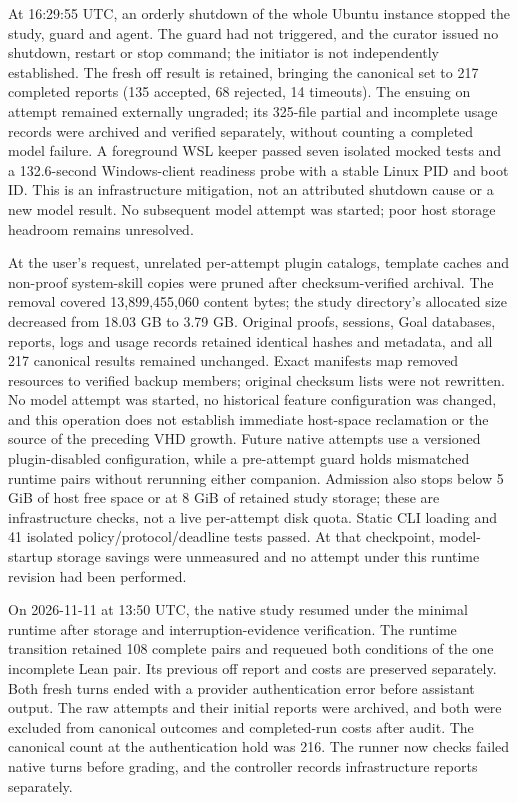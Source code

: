 \documentclass{article}
\begin{document}
At 16:29:55 UTC, an orderly shutdown of the whole Ubuntu instance stopped the study, guard and agent. The guard had not triggered, and the curator issued no shutdown, restart or stop command; the initiator is not independently established. The fresh off result is retained, bringing the canonical set to 217 completed reports (135 accepted, 68 rejected, 14 timeouts). The ensuing on attempt remained externally ungraded; its 325-file partial and incomplete usage records were archived and verified separately, without counting a completed model failure. A foreground WSL keeper passed seven isolated mocked tests and a 132.6-second Windows-client readiness probe with a stable Linux PID and boot ID. This is an infrastructure mitigation, not an attributed shutdown cause or a new model result. No subsequent model attempt was started; poor host storage headroom remains unresolved.

At the user's request, unrelated per-attempt plugin catalogs, template caches and non-proof system-skill copies were pruned after checksum-verified archival. The removal covered 13,899,455,060 content bytes; the study directory's allocated size decreased from 18.03 GB to 3.79 GB. Original proofs, sessions, Goal databases, reports, logs and usage records retained identical hashes and metadata, and all 217 canonical results remained unchanged. Exact manifests map removed resources to verified backup members; original checksum lists were not rewritten. No model attempt was started, no historical feature configuration was changed, and this operation does not establish immediate host-space reclamation or the source of the preceding VHD growth. Future native attempts use a versioned plugin-disabled configuration, while a pre-attempt guard holds mismatched runtime pairs without rerunning either companion. Admission also stops below 5 GiB of host free space or at 8 GiB of retained study storage; these are infrastructure checks, not a live per-attempt disk quota. Static CLI loading and 41 isolated policy/protocol/deadline tests passed. At that checkpoint, model-startup storage savings were unmeasured and no attempt under this runtime revision had been performed.

On 2026-11-11 at 13:50 UTC, the native study resumed under the minimal runtime after storage and interruption-evidence verification. The runtime transition retained 108 complete pairs and requeued both conditions of the one incomplete Lean pair. Its previous off report and costs are preserved separately. Both fresh turns ended with a provider authentication error before assistant output. The raw attempts and their initial reports were archived, and both were excluded from canonical outcomes and completed-run costs after audit. The canonical count at the authentication hold was 216. The runner now checks failed native turns before grading, and the controller records infrastructure reports separately.
\end{document}
